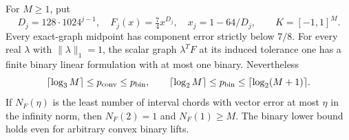 \begin{proposition}\label{prop:vector-power-obstruction}
For $M\ge1$, put
\[
 D_j=128\cdot1024^{j-1},\quad F_j(x)=\tfrac74x^{D_j},
 \quad x_j=1-64/D_j,\qquad K=[-1,1]^M.
\]
Every exact-graph midpoint has component error strictly below $7/8$.
For every real $\lambda$ with $\|\lambda\|_1=1$, the scalar graph
$\lambda^TF$ at its induced tolerance one has a finite binary linear
formulation with at most one binary. Nevertheless
\begin{equation}\label{eq:power-vector-counts}
 \lceil\log_3M\rceil\le p_{\mathrm{conv}}\le p_{\mathrm{bin}},
 \qquad
 \lceil\log_2M\rceil\le p_{\mathrm{bin}}\le\lceil\log_2(M+1)\rceil.
\end{equation}
If $N_F(\eta)$ is the least number of interval chords with vector error
at most $\eta$ in the infinity norm, then $N_F(2)=1$ and $N_F(1)\ge M$.
The binary lower bound holds even for arbitrary convex binary lifts.
\end{proposition}
